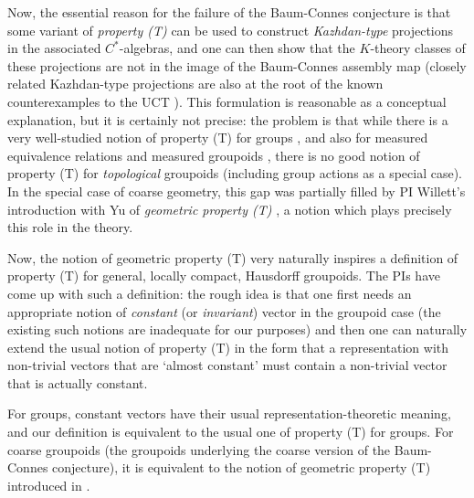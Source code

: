 Now, the essential reason for the failure of the Baum-Connes conjecture is that some variant of \emph{property (T)} can be used to construct \emph{Kazhdan-type} projections in the associated $C^*$-algebras, and one can then show that the $K$-theory classes of these projections are not in the image of the Baum-Connes assembly map (closely related Kazhdan-type projections are also at the root of the known counterexamples to the UCT \cite{Skandalis:1988rr}).  This formulation is reasonable as a conceptual explanation, but it is certainly not precise: the problem is that while there is a very well-studied notion of property (T) for groups \cite{Bekka:2000kx}, and also for measured equivalence relations and measured groupoids \cite{Anantharaman-Delaroche:2005pb}, there is no good notion of property (T) for \emph{topological} groupoids (including group actions as a special case).  In the special case of coarse geometry, this gap was partially filled by PI Willett's introduction with Yu of \emph{geometric property (T)} \cite{Willett:2013cr}, a notion which plays precisely this role in the theory.

Now, the notion of geometric property (T) very naturally inspires a definition of property (T) for general, locally compact, Hausdorff groupoids.   The PIs have come up with such a definition: the rough idea is that one first needs an appropriate notion of \emph{constant} (or \emph{invariant}) vector in the groupoid case (the existing such notions are inadequate for our purposes) and then one can naturally extend the usual notion of property (T) in the form that a representation with non-trivial vectors that are `almost constant' must contain a non-trivial vector that is actually constant.

For groups, constant vectors have their usual representation-theoretic meaning, and our definition is equivalent to the usual one of property (T) for groups.  For coarse groupoids (the groupoids underlying the coarse version of the Baum-Connes conjecture), it is equivalent to the notion of geometric property (T) introduced in \cite{Willett:2013cr}.   




